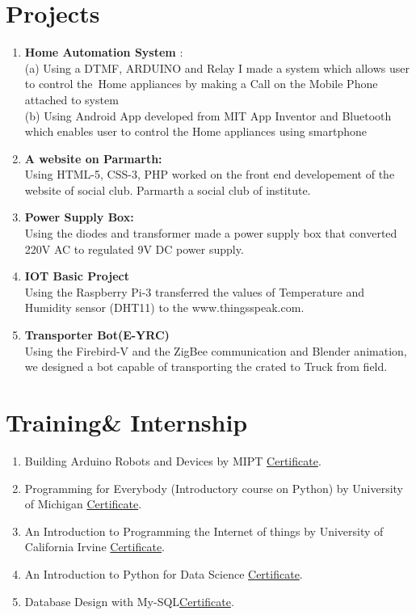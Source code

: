 \documentclass[12pt]{article}
\begin{document}
\section*{Projects}
\begin{enumerate}
  \item{\textbf{Home Automation System}} :\\(a) Using a DTMF, ARDUINO and Relay I made a system
which allows user to control the\ Home appliances by making a Call on the Mobile
Phone attached to system\\
(b) Using Android App developed from MIT App Inventor
and Bluetooth which enables user to control the Home appliances using smartphone
\item {\textbf{A website on Parmarth:}}\\ Using HTML-5, CSS-3, PHP worked on the front end developement of the website of social club.
Parmarth a social club of institute.
\item {\textbf{Power Supply Box:}}\\ Using the diodes and transformer made a power supply box that converted 220V AC to regulated 9V DC power supply.
\item {\textbf{IOT Basic Project}}\\ Using the Raspberry Pi-3 transferred the values of Temperature and Humidity sensor (DHT11) to the www.thingsspeak.com. 
\item {\textbf{Transporter Bot(E-YRC)}}\\ Using the Firebird-V and the ZigBee communication and Blender animation, we designed  a bot capable of transporting the crated to Truck from field.    
\end{enumerate}

\section*{Training\& Internship}
\begin{enumerate}
  \item Building Arduino Robots and Devices by MIPT \href{https://drive.google.com/open?id=1OdgRvGUVJlKDj6jBgbTeKgBTcAWb4hAs}{Certificate}. 
\item Programming for Everybody (Introductory course on Python) by University of Michigan
\href{https://drive.google.com/open?id=1bFMwfXUaMAlEdo0C462mUvpyfJMTv2jr}{Certificate}.
\item An Introduction to Programming the Internet of things by University of California Irvine \href{https://drive.google.com/open?id=1Cly1gg0PYxZJb4zLB8IZnftkQj3MmyOu}{Certificate}.
\item An Introduction to Python for Data Science \href{https://drive.google.com/open?id=1yZQDmsZnb0BlFxZFdd0phYQZYy7ax6FA}{Certificate}.
\item Database Design with My-SQL\href{https://drive.google.com/open?id=1Oa-SXJebTJWY2u02TiFzb9QqZ7XdkYcO}{Certificate}.
\end{enumerate}
\end{document}
